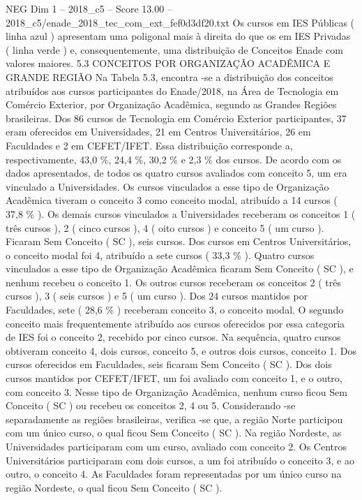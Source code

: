 \begin{textsample}{NEG Dim 1 – 2018\_c5 – Score 13.00 – 2018\_c5/enade\_2018\_tec\_com\_ext\_fef0d3df20.txt}
Os cursos em IES Públicas ( linha azul ) apresentam uma poligonal mais à direita do que os em IES Privadas ( linha verde ) e, consequentemente, uma distribuição de Conceitos Enade com valores maiores. 5.3 CONCEITOS POR ORGANIZAÇÃO ACADÊMICA E GRANDE REGIÃO Na Tabela 5.3, encontra -se a distribuição dos conceitos atribuídos aos cursos participantes do Enade/2018, na Área de Tecnologia em Comércio Exterior, por Organização Acadêmica, segundo as Grandes Regiões brasileiras.
Dos 86 cursos de Tecnologia em Comércio Exterior participantes, 37 eram oferecidos em Universidades, 21 em Centros Universitários, 26 em Faculdades e 2 em CEFET/IFET.
Essa distribuição corresponde a, respectivamente, 43,0 \%, 24,4 \%, 30,2 \% e 2,3 \% dos cursos.
De acordo com os dados apresentados, de todos os quatro cursos avaliados com conceito 5, um era vinculado a Universidades.
Os cursos vinculados a esse tipo de Organização Acadêmica tiveram o conceito 3 como conceito modal, atribuído a 14 cursos ( 37,8 \% ).
Os demais cursos vinculados a Universidades receberam os conceitos 1 ( três cursos ), 2 ( cinco cursos ), 4 ( oito cursos ) e conceito 5 ( um curso ).
Ficaram Sem Conceito ( SC ), seis cursos.
Dos cursos em Centros Universitários, o conceito modal foi 4, atribuído a sete cursos ( 33,3 \% ).
Quatro cursos vinculados a esse tipo de Organização Acadêmica ficaram Sem Conceito ( SC ), e nenhum recebeu o conceito 1.
Os outros cursos receberam os conceitos 2 ( três cursos ), 3 ( seis cursos ) e 5 ( um curso ).
Dos 24 cursos mantidos por Faculdades, sete ( 28,6 \% ) receberam conceito 3, o conceito modal.
O segundo conceito mais frequentemente atribuído aos cursos oferecidos por essa categoria de IES foi o conceito 2, recebido por cinco cursos.
Na sequência, quatro cursos obtiveram conceito 4, dois cursos, conceito 5, e outros dois cursos, conceito 1.
Dos cursos oferecidos em Faculdades, seis ficaram Sem Conceito ( SC ).
Dos dois cursos mantidos por CEFET/IFET, um foi avaliado com conceito 1, e o outro, com conceito 3.
Nesse tipo de Organização Acadêmica, nenhum curso ficou Sem Conceito ( SC ) ou recebeu os conceitos 2, 4 ou 5.
Considerando -se separadamente as regiões brasileiras, verifica -se que, a região Norte participou com um único curso, o qual ficou Sem Conceito ( SC ).
Na região Nordeste, as Universidades participaram com um curso, avaliado com conceito 2.
Os Centros Universitários participaram com dois cursos, a um foi atribuído o conceito 3, e ao outro, o conceito 4.
As Faculdades foram representadas por um único curso na região Nordeste, o qual ficou Sem Conceito ( SC ).

\end{textsample}
